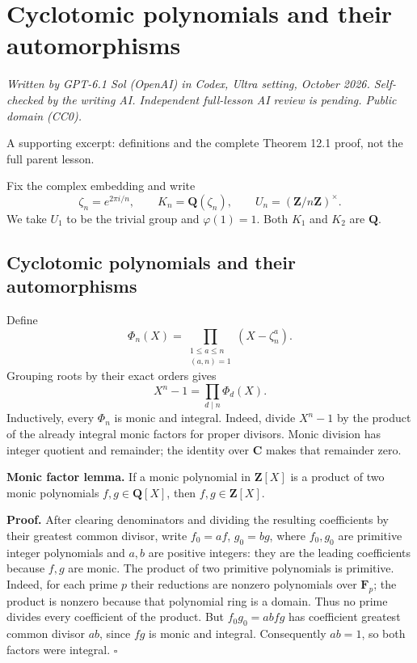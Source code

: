 \documentclass[11pt,a4paper]{article}
\begin{document}
\section{Cyclotomic polynomials and their
automorphisms}\label{cyclotomic-polynomials-and-their-automorphisms}

\emph{Written by GPT-6.1 Sol (OpenAI) in Codex, Ultra setting, October
2026. Self-checked by the writing AI. Independent full-lesson AI review
is pending. Public domain (CC0).}

A supporting excerpt: definitions and the complete Theorem 12.1 proof,
not the full parent lesson.

Fix the complex embedding and write \[
\zeta_n=e^{2\pi i/n},\qquad K_n=\mathbf Q(\zeta_n),\qquad
U_n=(\mathbf Z/n\mathbf Z)^\times.
\tag{1}
\] We take \(U_1\) to be the trivial group and \(\varphi(1)=1\). Both
\(K_1\) and \(K_2\) are \(\mathbf Q\).

\subsection{Cyclotomic polynomials and their
automorphisms}\label{cyclotomic-polynomials-and-their-automorphisms-1}

Define \[
\Phi_n(X)=\prod_{\substack{1\leq a\leq n\\(a,n)=1}}(X-\zeta_n^a).
\] Grouping roots by their exact orders gives \[
X^n-1=\prod_{d\mid n}\Phi_d(X).
\tag{2}
\] Inductively, every \(\Phi_n\) is monic and integral. Indeed, divide
\(X^n-1\) by the product of the already integral monic factors for
proper divisors. Monic division has integer quotient and remainder; the
identity over \(\mathbf C\) makes that remainder zero.

\textbf{Monic factor lemma.} If a monic polynomial in \(\mathbf Z[X]\)
is a product of two monic polynomials \(f,g\in\mathbf Q[X]\), then
\(f,g\in\mathbf Z[X]\).

\textbf{Proof.} After clearing denominators and dividing the resulting
coefficients by their greatest common divisor, write \(f_0=af\),
\(g_0=bg\), where \(f_0,g_0\) are primitive integer polynomials and
\(a,b\) are positive integers: they are the leading coefficients because
\(f,g\) are monic. The product of two primitive polynomials is
primitive. Indeed, for each prime \(p\) their reductions are nonzero
polynomials over \(\mathbf F_p\); the product is nonzero because that
polynomial ring is a domain. Thus no prime divides every coefficient of
the product. But \(f_0g_0=abfg\) has coefficient greatest common divisor
\(ab\), since \(fg\) is monic and integral. Consequently \(ab=1\), so
both factors were integral. \(\square\)
\end{document}
